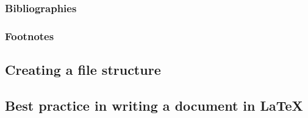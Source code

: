 \subsubsection{Bibliographies}\label{Sec:Bibliographies}


\subsubsection{Footnotes}


\subsection{Creating a file structure}\label{sec:FileStructure}


\subsection{Best practice in writing a document in LaTeX}

